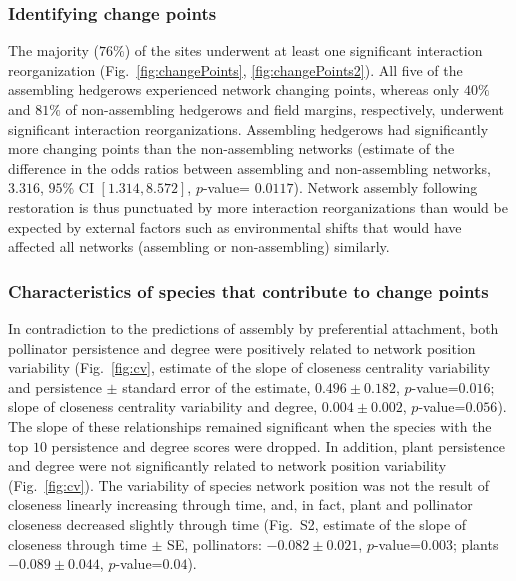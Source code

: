 \documentclass[12pt]{article}
\begin{document}
\subsubsection*{Identifying change points}

The majority ($76\%$) of the sites underwent at least one significant
interaction reorganization (Fig.~\ref{fig:changePoints},
\ref{fig:changePoints2}).  All five of the assembling hedgerows
experienced network changing points, whereas only $40\%$ and $81\%$ of
non-assembling hedgerows and field margins, respectively, underwent
significant interaction reorganizations. Assembling hedgerows had
significantly more changing points than the non-assembling networks
(estimate of the difference in the odds ratios between assembling and
non-assembling networks, $3.316$, $95\%$ CI $[1.314, 8.572]$,
$p$-value= $0.0117$). Network assembly following restoration is thus
punctuated by more interaction reorganizations than would be expected
by external factors such as environmental shifts that would have
affected all networks (assembling or non-assembling) similarly.

\subsubsection*{Characteristics of species that contribute to change
  points}

In contradiction to the predictions of assembly by preferential
attachment, both pollinator persistence and degree were positively
related to network position variability (Fig.~\ref{fig:cv}, estimate
of the slope of closeness centrality variability and persistence $\pm$
standard error of the estimate, $0.496 \pm 0.182$, $p$-value=$0.016$;
slope of closeness centrality variability and degree, $0.004 \pm
0.002$, $p$-value=$0.056$). The slope of these relationships remained
significant when the species with the top $10$ persistence and degree
scores were dropped. In addition, plant persistence and degree were
not significantly related to network position variability
(Fig.~\ref{fig:cv}). %
The variability of species network position was not the result of
closeness linearly increasing through time, and, in fact, plant and
pollinator closeness decreased slightly through time (Fig.~S2,
estimate of the slope of closeness through time $\pm$ SE, pollinators:
$-0.082 \pm 0.021$, $p$-value=$0.003$; plants $-0.089 \pm 0.044$,
$p$-value=$0.04$).
\end{document}
